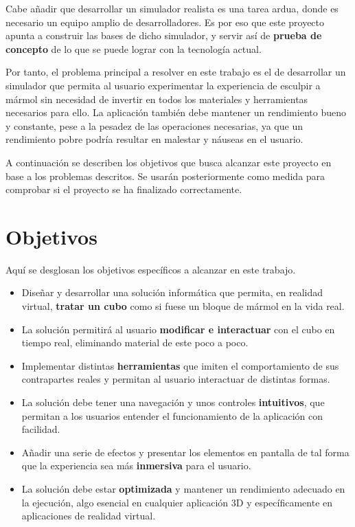 Cabe añadir que desarrollar un simulador realista es una tarea ardua, donde es necesario un equipo amplio de desarrolladores. Es por eso que este proyecto apunta a construir las bases de dicho simulador, y servir así de \textbf{prueba de concepto} de lo que se puede lograr con la tecnología actual.

Por tanto, el problema principal a resolver en este trabajo es el de desarrollar un simulador que permita al usuario experimentar la experiencia de esculpir a mármol sin necesidad de invertir en todos los materiales y herramientas necesarios para ello. La aplicación también debe mantener un rendimiento bueno y constante, pese a la pesadez de las operaciones necesarias, ya que un rendimiento pobre podría resultar en malestar y náuseas en el usuario.

A continuación se describen los objetivos que busca alcanzar este proyecto en base a los problemas descritos. Se usarán posteriormente como medida para comprobar si el proyecto se ha finalizado correctamente.

\section{Objetivos}

Aquí se desglosan los objetivos específicos a alcanzar en este trabajo.

\begin{itemize}
	\item Diseñar y desarrollar una solución informática que permita, en realidad virtual, \textbf{tratar un cubo} como si fuese un bloque de mármol en la vida real.
	\item La solución permitirá al usuario \textbf{modificar e interactuar} con el cubo en tiempo real, eliminando material de este poco a poco.
	\item Implementar distintas \textbf{herramientas} que imiten el comportamiento de sus contrapartes reales y permitan al usuario interactuar de distintas formas.
	\item La solución debe tener una navegación y unos controles \textbf{intuitivos}, que permitan a los usuarios entender el funcionamiento de la aplicación con facilidad.
	\item Añadir una serie de efectos y presentar los elementos en pantalla de tal forma que la experiencia sea más \textbf{inmersiva} para el usuario.
	\item La solución debe estar \textbf{optimizada} y mantener un rendimiento adecuado en la ejecución, algo esencial en cualquier aplicación 3D y específicamente en aplicaciones de realidad virtual.
\end{itemize}